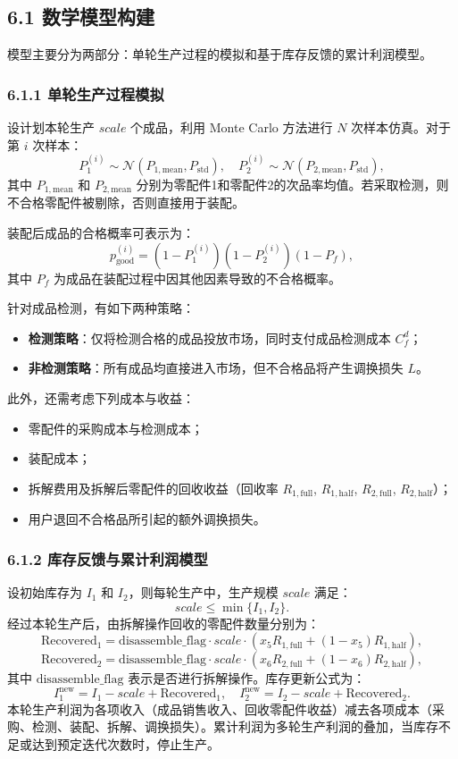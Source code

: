 \documentclass{article}
\begin{document}
	
	
	
	\subsection*{6.1 数学模型构建}
	模型主要分为两部分：单轮生产过程的模拟和基于库存反馈的累计利润模型。
	
	\subsubsection*{6.1.1 单轮生产过程模拟}
	设计划本轮生产 $scale$ 个成品，利用 Monte Carlo 方法进行 $N$ 次样本仿真。对于第 $i$ 次样本：
	\[
	P_1^{(i)} \sim \mathcal{N}(P_{1,\text{mean}}, P_{\text{std}}), \quad
	P_2^{(i)} \sim \mathcal{N}(P_{2,\text{mean}}, P_{\text{std}}),
	\]
	其中 $P_{1,\text{mean}}$ 和 $P_{2,\text{mean}}$ 分别为零配件1和零配件2的次品率均值。若采取检测，则不合格零配件被剔除，否则直接用于装配。
	
	装配后成品的合格概率可表示为：
	\[
	p_{\text{good}}^{(i)} = (1-P_1^{(i)})(1-P_2^{(i)})(1-P_f),
	\]
	其中 $P_f$ 为成品在装配过程中因其他因素导致的不合格概率。
	
	针对成品检测，有如下两种策略：
	\begin{itemize}
		\item \textbf{检测策略}：仅将检测合格的成品投放市场，同时支付成品检测成本 $C_f^d$；
		\item \textbf{非检测策略}：所有成品均直接进入市场，但不合格品将产生调换损失 $L$。
	\end{itemize}
	
	此外，还需考虑下列成本与收益：
	\begin{itemize}
		\item 零配件的采购成本与检测成本；
		\item 装配成本；
		\item 拆解费用及拆解后零配件的回收收益（回收率 $R_{1,\text{full}}$, $R_{1,\text{half}}$, $R_{2,\text{full}}$, $R_{2,\text{half}}$）；
		\item 用户退回不合格品所引起的额外调换损失。
	\end{itemize}
	
	\subsubsection*{6.1.2 库存反馈与累计利润模型}
	设初始库存为 $I_1$ 和 $I_2$，则每轮生产中，生产规模 $scale$ 满足：
	\[
	scale \leq \min\{I_1, I_2\}.
	\]
	经过本轮生产后，由拆解操作回收的零配件数量分别为：
	\[
	\text{Recovered}_1 = \text{disassemble\_flag} \cdot scale \cdot \left( x_5 R_{1,\text{full}} + (1-x_5) R_{1,\text{half}} \right),
	\]
	\[
	\text{Recovered}_2 = \text{disassemble\_flag} \cdot scale \cdot \left( x_6 R_{2,\text{full}} + (1-x_6) R_{2,\text{half}} \right),
	\]
	其中 $\text{disassemble\_flag}$ 表示是否进行拆解操作。库存更新公式为：
	\[
	I_1^{\text{new}} = I_1 - scale + \text{Recovered}_1, \quad
	I_2^{\text{new}} = I_2 - scale + \text{Recovered}_2.
	\]
	本轮生产利润为各项收入（成品销售收入、回收零配件收益）减去各项成本（采购、检测、装配、拆解、调换损失）。累计利润为多轮生产利润的叠加，当库存不足或达到预定迭代次数时，停止生产。
\end{document}

